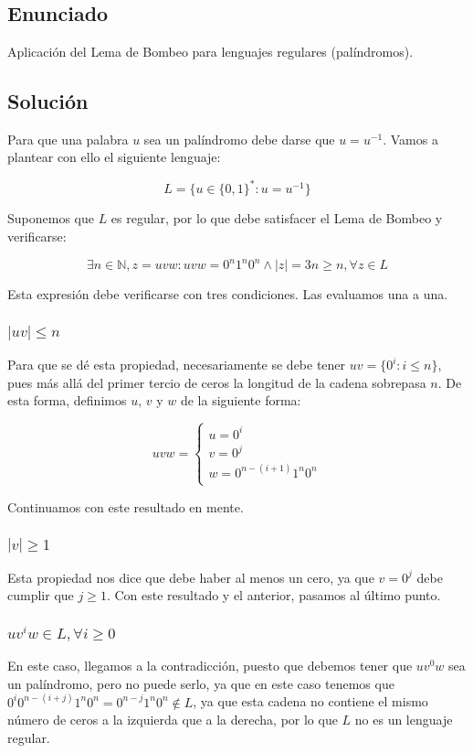 \chapter{}

\section{Enunciado}

Aplicación del Lema de Bombeo para lenguajes regulares (palíndromos).

\section{Solución}

Para que una palabra $u$ sea un palíndromo debe darse que $u = u^{-1}$.
Vamos a plantear con ello el siguiente lenguaje:

\[L = \Big\{u \in {\{0,1\}}^* : u = u^{-1}\Big\}\]

Suponemos que $L$ es regular, por lo que debe satisfacer el Lema de Bombeo y verificarse:

\[
	\exists n \in\mathbb{N}, z = uvw : uvw = 0^{n}1^{n}0^{n} \land |z| = 3n \geq n, \forall z \in L
\]

Esta expresión debe verificarse con tres condiciones.
Las evaluamos una a una.

\subsection*{$|uv| \leq n$}

Para que se dé esta propiedad, necesariamente se debe tener $uv = \{0^i : i \leq n\}$, pues más allá del primer tercio de ceros la longitud de la cadena sobrepasa $n$.
De esta forma, definimos $u$, $v$ y $w$ de la siguiente forma:

\[
	uvw =
	\begin{cases}
		u = 0^i               \\
		v = 0^j               \\
		w = 0^{n-(i+1)}1^n0^n \\
	\end{cases}
\]

Continuamos con este resultado en mente.

\subsection*{$|v| \geq 1$}

Esta propiedad nos dice que debe haber al menos un cero, ya que $v= 0^j$ debe cumplir que $j \geq 1$.
Con este resultado y el anterior, pasamos al último punto.

\subsection*{$uv^{i}w \in L, \forall i \geq 0$}

En este caso, llegamos a la contradicción, puesto que debemos tener que $uv^{0}w$ sea un palíndromo, pero no puede serlo, ya que en este caso tenemos que $0^{i}0^{n-(i+j)}1^{n}0^{n} = 0^{n-j}1^{n}0^{n} \notin L$, ya que esta cadena no contiene el mismo número de ceros a la izquierda que a la derecha, por lo que $L$ no es un lenguaje regular.
